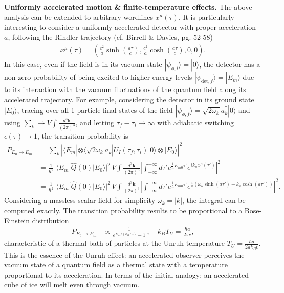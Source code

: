 \documentclass[../QFT_main.tex]{subfiles}
\begin{document}
\begin{mytheorem}
\noindent
\textbf{Uniformly accelerated motion \& finite-temperature effects.}
The above analysis can be extended to arbitrary wordlines $x^\mu(\tau)$.
It is particularly interesting to consider a uniformly accelerated detector with proper acceleration $a$, following the Rindler trajectory (cf. Birrell \& Davies, pg. 52-58)
{\small
\begin{align}
    x^\mu(\tau) = \left(\frac{c^2}{a}\sinh\left(\frac{a \tau}{c}\right), \frac{c^2}{a}\cosh\left(\frac{a \tau}{c}\right),0,0\right).
\end{align}
}
In this case, even if the field is in its vacuum state $|\psi_{\phi,i}\rangle = |0\rangle$, the detector has a non-zero probability of being excited to higher energy levels $|\psi_{\mathrm{det},f}\rangle = |E_m\rangle$ due to its interaction with the vacuum fluctuations of the quantum field along its accelerated trajectory.
For example, considering the detector in its ground state $|E_0\rangle$, tracing over all 1-particle final states of the field $|\psi_{\phi,f}\rangle=\sqrt{2\omega_k}a_k^\dagger|0\rangle$ and using $\sum_k \to V\int \frac{d^3\mathbf{k}}{(2\pi)^3}$, and letting $\tau_f-\tau_i\to \infty$ with adiabatic switching $\epsilon(\tau)\to 1$, the transition probability is
{\small
\begin{align}
    P_{E_0\to E_m} &= \sum_{k} \left|\langle E_m | \otimes \langle \sqrt{2\omega_k} a_k^\dagger | U_I(\tau_f,\tau_i) | 0 \rangle \otimes | E_0 \rangle\right|^2 \\
    &= \frac{1}{\hbar^2} |\langle E_m | \hat{Q}(0) | E_0 \rangle|^2\, V\int \frac{d^3\mathbf{k}}{(2\pi)^3} \left| \int_{-\infty}^{+\infty} d\tau' e^{\frac{i}{\hbar}E_{m0} \tau'} e^{i k_\mu x^\mu(\tau')} \right|^2 \\
    &= \frac{1}{\hbar^2} |\langle E_m | \hat{Q}(0) | E_0 \rangle|^2 \,V \int \frac{d^3\mathbf{k}}{(2\pi)^3} \left| \int_{-\infty}^{+\infty} d\tau'e^{\frac{i}{\hbar}E_{m0} \tau'} e^{\frac{i}{a}\left(\omega_k \sinh\left(a \tau'\right) - k_x \cosh\left(a \tau'\right)\right)} \right|^2.
\end{align}
}
Considering a massless scalar field for simplicity $\omega_k=|k|$, the integral can be computed exactly.
The transition probability results to be proportional to a Bose-Einstein distribution
{\small
\begin{align}
    P_{E_0\to E_m} &\propto \frac{1}{e^{E_m/(k_B T_U)} - 1}\,,\quad k_BT_U = \frac{\hbar a}{2\pi c},
\end{align}
}
characteristic of a thermal bath of particles at the Unruh temperature $T_U = \frac{\hbar a}{2\pi k_B c}$.
This is the essence of the Unruh effect: an accelerated observer perceives the vacuum state of a quantum field as a thermal state with a temperature proportional to its acceleration.
In terms of the initial analogy: an accelerated cube of ice will melt even through vacuum.
%
\end{mytheorem}
\end{document}
